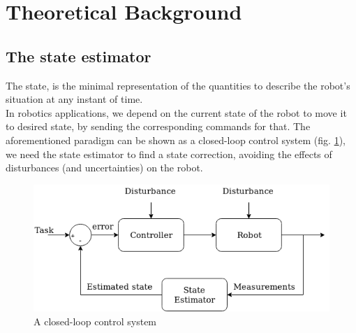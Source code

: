 \documentclass[a4paper,12pt]{article}
\begin{document}
\section{Theoretical Background} 
\subsection{The state estimator}
The state, is the minimal representation of the quantities to describe the robot's situation at any instant of time.\\
In robotics applications, we depend on the current state of the robot to move it to desired state, by sending the corresponding commands for that. The aforementioned paradigm can be shown as a closed-loop control system (fig. \ref{fig:control}), we need the state estimator to find a state correction, avoiding the effects of disturbances (and uncertainties) on the robot.

\begin{figure}[H]
\centering
\includegraphics[width=\textwidth]{img/control(1).png}
\caption{A closed-loop control system}
\label{fig:control}
\end{figure}
\end{document}
